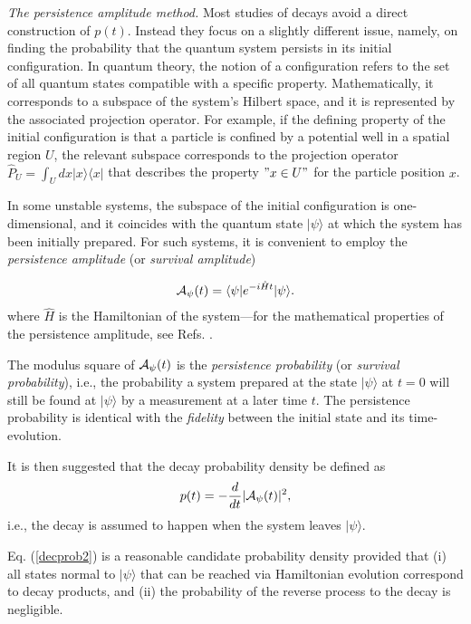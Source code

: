 \documentclass[12pt]{article}
\numberwithin{equation}{section}
\begin{document}
 \medskip
 {\em The persistence amplitude method.}
Most studies of decays avoid  a direct construction of $p(t)$.  Instead they focus on a slightly different issue,  namely, on finding the probability that the quantum system persists in its initial  configuration. In quantum theory, the notion of a configuration refers to the set of all quantum states compatible with a specific property. Mathematically, it corresponds  to a subspace of the system's Hilbert space, and it is represented by the associated projection operator. For example, if the defining property of the initial configuration is that a particle is confined by a potential well in a spatial region $U$, the relevant subspace corresponds to the projection operator $\hat{P}_U = \int_U dx |x\rangle \langle x|$ that describes the property $"x \in U"$ for the particle position $x$.

 In some unstable systems, the subspace of the initial configuration is one-dimensional, and it coincides with the quantum state  $|\psi\rangle$ at which the system has been initially prepared. For such systems,
it is convenient to employ the
   {\em persistence amplitude} (or {\em survival amplitude})

\begin{eqnarray}
{\cal A}_{\psi}(t) = \langle \psi|e^{-i\hat{H}t}|\psi\rangle. \label{persiss}
\end{eqnarray}
where $\hat{H}$ is the Hamiltonian of the system---for the mathematical properties of the persistence amplitude, see Refs. \cite{GhiFo, Peres80}.


The modulus square of
  ${\cal A}_{\psi}(t)$ is the {\em persistence probability} (or {\em survival probability}), i.e., the probability  a system prepared at the state $|\psi\rangle$ at $t = 0$ will still  be found at $|\psi\rangle$ by a measurement at a later time $t$. The persistence probability is identical with the {\em fidelity} between the initial state and its time-evolution.


   It is then suggested that the decay probability density be defined as
\begin{eqnarray}
p(t) = - \frac{d}{dt} |{\cal A}_{\psi}(t)|^2, \label{decprob2}
\end{eqnarray}
i.e., the decay is assumed to happen when the system leaves  $|\psi\rangle$.

Eq. (\ref{decprob2}) is a reasonable candidate probability density provided that (i) all states  normal to $|\psi\rangle$ that can be reached via Hamiltonian evolution correspond to decay products, and (ii) the probability of the reverse  process to the decay is negligible.
\end{document}
